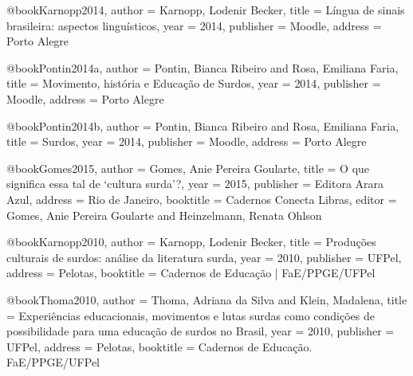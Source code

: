@book{Karnopp2014,
  author = {Karnopp, Lodenir Becker},
  title = {Língua de sinais brasileira: aspectos linguísticos},
  year = {2014},
  publisher = {Moodle},
  address = {Porto Alegre}
}

@book{Pontin2014a,
  author = {Pontin, Bianca Ribeiro and Rosa, Emiliana Faria},
  title = {Movimento, história e Educação de Surdos},
  year = {2014},
  publisher = {Moodle},
  address = {Porto Alegre}
}

@book{Pontin2014b,
  author = {Pontin, Bianca Ribeiro and Rosa, Emiliana Faria},
  title = {Surdos},
  year = {2014},
  publisher = {Moodle},
  address = {Porto Alegre}
}

@book{Gomes2015,
  author = {Gomes, Anie Pereira Goularte},
  title = {O que significa essa tal de `cultura surda'?},
  year = {2015},
  publisher = {Editora Arara Azul},
  address = {Rio de Janeiro},
  booktitle = {Cadernos Conecta Libras},
  editor = {Gomes, Anie Pereira Goularte and Heinzelmann, Renata Ohlson}
}

@book{Karnopp2010,
  author = {Karnopp, Lodenir Becker},
  title = {Produções culturais de surdos: análise da literatura surda},
  year = {2010},
  publisher = {UFPel},
  address = {Pelotas},
  booktitle = {Cadernos de Educação | FaE/PPGE/UFPel}
}

@book{Thoma2010,
  author = {Thoma, Adriana da Silva and Klein, Madalena},
  title = {Experiências educacionais, movimentos e lutas surdas como condições de possibilidade para uma educação de surdos no Brasil},
  year = {2010},
  publisher = {UFPel},
  address = {Pelotas},
  booktitle = {Cadernos de Educação. FaE/PPGE/UFPel}
}

